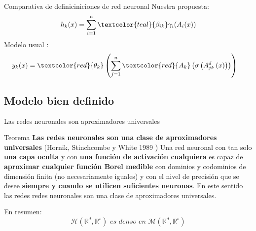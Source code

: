 \documentclass{beamer}
\newcommand{\R}{\mathbb{R}}
\begin{document}
\begin{frame}{Comparativa de definiciniciones de red neuronal}
    Nuestra propuesta: 
    \begin{align*}
                h_k(x) = 
                \sum_{i=1}^{n} \textcolor{teal}{\beta_{i k}} \gamma_{i}( A_{i}(x))
    \end{align*}
    Modelo usual \cite{MostafaLearningFromData}:
    \begin{align*}
        y_k(x) &= 
        \textcolor{red}{\theta_k}
        \left( 
            \sum^n_{j=1} \textcolor{red}{A_{k}}
            \left(
                \sigma 
                \left(
                    A^{d}_{j k}
                    \left(
                        x
                    \right)
                \right)
            \right)
        \right)
    \end{align*}
\end{frame}
\subsection{Modelo bien definido}
\begin{frame}{Las redes neuronales son aproximadores universales}
    \begin{block}{Teorema  \textbf{Las redes neuronales son una clase de aproximadores universales}}
        (Hornik, Stinchcombe y White 1989 \cite{HORNIK1989359})
        Una red neuronal con tan solo \textbf{una capa oculta} y con \textbf{una función de activación cualquiera} es capaz de \textbf{aproximar cualquier 
        función Borel medible}  con dominios y codominios de dimensión finita (no necesariamente iguales) y con el nivel de precisión que se desee \textbf{siempre y cuando 
        se utilicen suficientes neuronas}. En este sentido las redes redes neuronales son una clase de aproximadores universales.
    \end{block}
    En resumen: 
    \begin{equation*}
        \mathcal{H}(\R^d,\R^s)  \textit{ es denso en } \mathcal{M}(\R^d,\R^s) 
    \end{equation*}
\end{frame}
\end{document}
